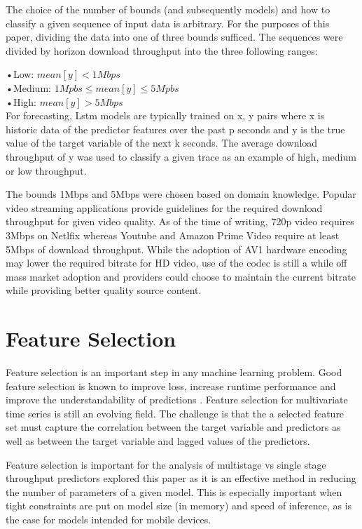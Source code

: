 The choice of the number of bounds (and subsequently models) and how to classify a given sequence of input data is arbitrary. For the purposes of this paper, dividing the data into one of three bounds sufficed. The sequences were divided by horizon download throughput into the three following ranges:

•Low:    $ mean[y] < 1Mbps$ \\
•Medium: $1Mpbs \leq mean[y] \leq 5Mpbs$ \\
•High:   $ mean[y] > 5Mbps$ \\

For forecasting, Lstm models are typically trained on x, y pairs where x is historic data of the predictor features over the past p seconds and y is the true value of the target variable of the next k seconds. The average download throughput of y was used to classify a given trace as an example of high, medium or low throughput.

The bounds 1Mbps and 5Mbps were chosen based on domain knowledge. Popular video streaming applications provide guidelines for the required download throughput for given video quality. As of the time of writing, 720p video requires 3Mbps on Netlfix whereas Youtube and Amazon Prime Video require at least 5Mbps of download throughput. While the adoption of AV1 hardware encoding may lower the required bitrate for HD video, use of the codec is still a while off mass market adoption and providers could choose to maintain the current bitrate while providing better quality source content.

\section{Feature Selection}
\label{sec:feature_selection}
Feature selection is an important step in any machine learning problem. Good feature selection is known to improve loss, increase runtime performance and improve the understandability of predictions \cite{guyon2003introduction}.
Feature selection for multivariate time series is still an evolving field. The challenge is that the a selected feature set must capture the correlation between the target variable and predictors as well as between the target variable and lagged values of the predictors.

Feature selection is important for the analysis of multistage vs single stage throughput predictors explored this paper as it is an effective method in reducing the number of parameters of a given model. This is especially important when tight constraints are put on model size (in memory) and speed of inference, as is the case for models intended for mobile devices.

